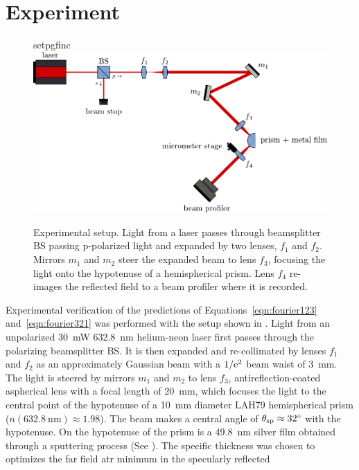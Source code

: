 \section{Experiment}\label{sec:intexperimental}
\begin{figure}[ht]
\centering
{setpgfinc}
\includegraphics[keepaspectratio,width=14cm]{interference/figures/opticalsetup.pdf}
\caption{Experimental setup.  Light from a laser passes through beamsplitter
BS passing p-polarized light and expanded by two lenses, $f_1$ and $f_2$.
Mirrors $m_1$ and $m_2$ steer the expanded beam to lens $f_3$, focusing the
light onto the hypotenuse of a hemispherical prism.  Lens $f_4$ re-images the reflected field to a beam profiler where it is recorded.}
\label{fig:opticalsetup}
\end{figure}
Experimental verification of the predictions of Equations~\ref{eqn:fourier123}
and~\ref{eqn:fourier321} was performed with the setup shown in
.  Light from an
unpolarized \SI{30}{\milli\watt} \SI{632.8}{\nano\meter} helium-neon
laser first passes through the polarizing
beamsplitter BS\@.  It is then expanded and re-collimated by lenses $f_1$ and $f_2$ as an
approximately Gaussian beam with a $1/{\mathrm{e}}^2$ beam waist of
\SI{3}{\milli\meter}. The light is steered by mirrors $m_1$ and $m_2$ to
lens $f_3$, antireflection-coated aspherical lens with a focal length of
\SI{20}{\milli\meter}, which
focuses the light to the central point of the hypotenuse of a
\SI{10}{\milli\meter} diameter LAH79 hemispherical prism
($n(\SI{632.8}{\nano\meter})\approx1.98$).  The beam makes a central angle
of $\theta_\mathrm{sp}\approx\SI{32}{\degree}$ with the hypotenuse.
On the hypotenuse of the prism is a \SI{49.8}{\nano\meter} silver film
obtained through a sputtering process (See ).
The specific thickness was chosen to
optimizes the far field \gls{atr} minimum in the specularly reflected
